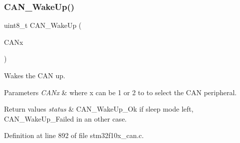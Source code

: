 \subsubsection{\texorpdfstring{C\+A\+N\+\_\+\+Wake\+Up()}{CAN\_WakeUp()}}
{\footnotesize\ttfamily uint8\+\_\+t C\+A\+N\+\_\+\+Wake\+Up (\begin{DoxyParamCaption}\item[{\hyperlink{struct_c_a_n___type_def}{C\+A\+N\+\_\+\+Type\+Def} $\ast$}]{C\+A\+Nx }\end{DoxyParamCaption})}



Wakes the C\+AN up. 


\begin{DoxyParams}{Parameters}
{\em C\+A\+Nx} & where x can be 1 or 2 to to select the C\+AN peripheral. \\
\hline
\end{DoxyParams}

\begin{DoxyRetVals}{Return values}
{\em status} & C\+A\+N\+\_\+\+Wake\+Up\+\_\+\+Ok if sleep mode left, C\+A\+N\+\_\+\+Wake\+Up\+\_\+\+Failed in an other case. \\
\hline
\end{DoxyRetVals}


Definition at line 892 of file stm32f10x\+\_\+can.\+c.

